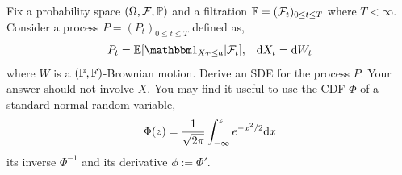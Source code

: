 \begin{problem}
    Fix a probability space \( (\Omega, \mathcal{F}, \mathbb{P}) \) and a filtration \( \mathbb{F} = (\mathcal{F}_t)_{0\leq t\leq T} \) where \( T< \infty \). Consider a process \( P = (P_t)_{0\leq t\leq T} \) defined as,
    \begin{align*}
        P_t = \EE[\bOne_{X_T\leq a} | \cF_t], && \d X_t = \d W_t
    \end{align*}
    where \( W \) is a \( (\mathbb{P},\mathbb{F}) \)-Brownian motion. Derive an SDE for the process \( P \). Your answer should not involve \( X \). You may find it useful to use the CDF \( \Phi \) of a standard normal random variable,
    \begin{align*}
        \Phi(z) = \frac{1}{\sqrt{2\pi}} \int_{-\infty}^{z} e^{-x^2/2}\mathrm{d} x
    \end{align*}
    its inverse \( \Phi^{-1} \) and its derivative \( \phi:= \Phi' \).
\end{problem}

